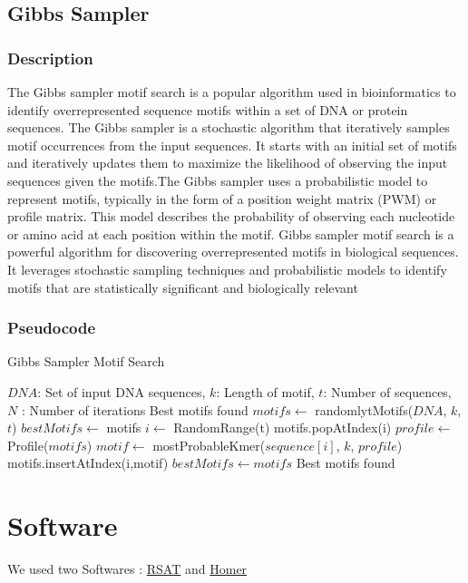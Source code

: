 \documentclass[11pt]{article}
\begin{document}
\subsection{Gibbs Sampler}
\subsubsection{Description}
The Gibbs sampler motif search is a popular algorithm used in bioinformatics to identify overrepresented sequence motifs within a set of DNA or protein sequences.
The Gibbs sampler is a stochastic algorithm that iteratively samples motif occurrences from the input sequences. It starts with an initial set of motifs and iteratively updates them to maximize the likelihood of observing the input sequences given the motifs.The Gibbs sampler uses a probabilistic model to represent motifs, typically in the form of a position weight matrix (PWM) or profile matrix. This model describes the probability of observing each nucleotide or amino acid at each position within the motif. Gibbs sampler motif search is a powerful algorithm for discovering overrepresented motifs in biological sequences. It leverages stochastic sampling techniques and probabilistic models to identify motifs that are statistically significant and biologically relevant
\subsubsection{Pseudocode}

\begin{algorithm}
\caption{Gibbs Sampler Motif Search}
\label{alg:gibbs_sampler}
\begin{algorithmic}[1]
\REQUIRE $DNA$: Set of input DNA sequences, $k$: Length of motif, $t$: Number of sequences,
$N$ : Number of iterations
\ENSURE Best motifs found
\STATE $motifs \leftarrow$ randomlytMotifs($DNA$, $k$, $t$)
\STATE $bestMotifs \leftarrow$ motifs
    \STATE $i \leftarrow$ RandomRange(t)
    \STATE motifs.popAtIndex(i)
    \STATE $profile \leftarrow$ Profile($motifs$)
    \STATE $motif \leftarrow$ mostProbableKmer($sequence[i]$, $k$, $profile$)
    \STATE motifs.insertAtIndex(i,motif)
        \STATE $bestMotifs \leftarrow motifs$
    \ENDIF
\ENDFOR
\RETURN Best motifs found
\end{algorithmic}
\end{algorithm}
\newpage
\section{Software}
We used two Softwares : \href{http://rsat.sb-roscoff.fr}{RSAT} and \href{http://homer.ucsd.edu/homer/}{Homer}
\end{document}
